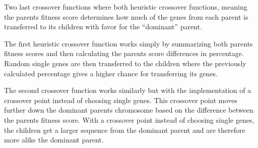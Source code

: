 Two last crossover functions where both heuristic crossover functions, meaning the parents fitness score determines how much of the genes from each parent is transferred to its children with favor for the “dominant” parent.

\begin{par}
	The first heuristic crossover function works simply by summarizing both parents fitness scores and then calculating the parents score differences in percentage. Random single genes are then transferred to the children where the previously calculated percentage gives a higher chance for transferring its genes.

	\label{par:swap single genes}
\end{par}

\begin{par}
	The second crossover function works similarly but with the implementation of a crossover point instead of choosing single genes. This crossover point moves further down the dominant parents chromosome based on the difference between the parents fitness score. With a crossover point instead of choosing single genes, the children get a larger sequence from the dominant parent and are therefore more alike the dominant parent.
	\label{par:swap sequnce of genes}
\end{par}
